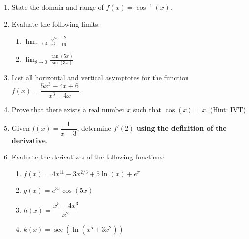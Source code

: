 \documentclass[12pt]{article}
\newcommand{\di}{\displaystyle}
\begin{document}
\begin{enumerate}
  \item State the domain and range of $f(x) = \cos^{-1}(x)$. 
 
 
 
 \vspace{2cm}
 
 
 
 \item Evaluate the following limits:
 \begin{enumerate}
 \item $\di \lim_{x\to 4}\frac{\sqrt{x}-2}{x^2-16}$ 
 
 \vspace{4cm}
 
 \item $\di \lim_{\theta\to 0}\frac{\tan(5x)}{\sin(3x)}$
 \end{enumerate}
 \vspace{4cm}
 
 \item List all horizontal and vertical asymptotes for the function $f(x) = \dfrac{5x^3-4x+6}{x^3-4x}$. 

\vspace{3.5cm}

 \item Prove that there exists a real number $x$ such that $\cos(x)=x$. (Hint: IVT)
 
\newpage

\item Given $f(x) = \dfrac{1}{x-3}$, determine $f'(2)$ \textbf{using the definition of the derivative}. 

\vspace{6cm}

\item Evaluate the derivatives of the following functions:
\begin{enumerate}
\item $f(x) = 4x^{11}-3x^{2/3}+5\ln(x)+e^\pi$
\vspace{2cm}

\item $g(x) = e^{3x}\cos(5x)$

\vspace{3cm}

\item $h(x) = \dfrac{x^5-4x^3}{x^2}$

\vspace{3cm}

\item $k(x) = \sec(\ln(x^5+3x^2))$
\end{enumerate}
\end{enumerate}
\end{document}
